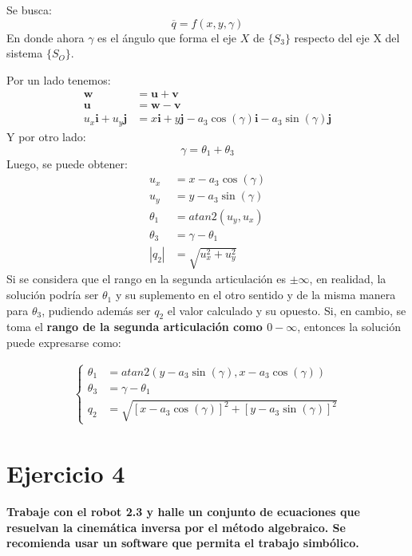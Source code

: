 \documentclass[a4paper,12pt]{article}
\begin{document}
Se busca:
\begin{equation*}
    \overline{q} = f(x, y, \gamma)
\end{equation*}
En donde ahora $\gamma$ es el ángulo que forma el eje $X$ de $\{S_3\}$ respecto del eje X del sistema $\{S_O\}$.

Por un lado tenemos:
\begin{align*}
    \mathbf{w} &= \mathbf{u} + \mathbf{v}\\
    \mathbf{u} &= \mathbf{w} - \mathbf{v}\\
    u_x\mathbf{i} + u_y\mathbf{j} &= x\mathbf{i} + y\mathbf{j} - a_3\cos(\gamma)\mathbf{i} - a_3\sin(\gamma)\mathbf{j}
\end{align*}
Y por otro lado:
\begin{equation*}
    \gamma = \theta_1 + \theta_3
\end{equation*}
Luego, se puede obtener:
\begin{align*}
    u_x &= x - a_3\cos(\gamma)\\
    u_y &= y - a_3\sin(\gamma)\\
    \theta_1 &= atan2(u_y, u_x)\\
    \theta_3 &= \gamma - \theta_1\\
    |q_2| &= \sqrt{u_x^2 + u_y^2}
\end{align*}
Si se considera que el rango en la segunda articulación es $\pm \infty$, en realidad, la solución podría ser $\theta_1$ y su suplemento en el otro sentido y de la misma manera para $\theta_3$, pudiendo además ser $q_2$ el valor calculado y su opuesto.
Si, en cambio, se toma el \textbf{rango de la segunda articulación como $0-\infty$}, entonces la solución puede expresarse como:

\begin{align}
    \begin{cases}
        \theta_1 &= atan2(y - a_3\sin(\gamma), x - a_3\cos(\gamma))\\
        \theta_3 &= \gamma - \theta_1\\
        q_2 &= \sqrt{\left[x - a_3\cos(\gamma)\right]^2 + \left[y - a_3\sin(\gamma)\right]^2}
    \end{cases}
\end{align}

\section{Ejercicio 4}
\textbf{Trabaje con el robot 2.3 y halle un conjunto de ecuaciones que resuelvan la
cinemática inversa por el método algebraico. Se recomienda usar un software que permita el
trabajo simbólico.}
\end{document}
